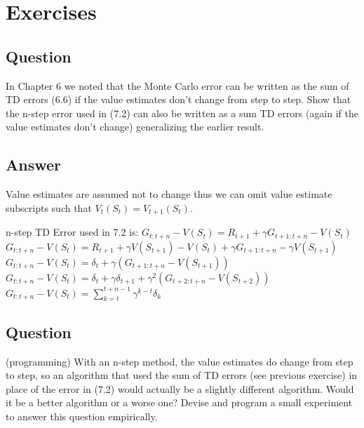 \documentclass[11pt]{article}
\begin{document}
    \maketitle
    \setcounter{section}{6}


    \section{Exercises}

    \subsection{Question}

    In Chapter 6 we noted that the Monte Carlo error can be written as the sum of TD errors (6.6) if the value estimates don’t change from step to step.
    Show that the n-step error used in (7.2) can also be written as a sum TD errors (again if the value estimates don’t change) generalizing the earlier result.

    \subsection*{Answer}

    Value estimates are assumed not to change thus we can omit value estimate subscripts such that $ V_t(S_t) = V_{t+1}(S_t)$.

    n-step TD Error used in 7.2  is:
    \newline
    $G_{t:t+n} - V(S_t) = R_{t+1} + \gamma G_{t+1:t+n} - V(S_t) $
    \newline
    $G_{t:t+n} - V(S_t) = R_{t+1} + \gamma V(S_{t+1}) - V(S_t) + \gamma G_{t+1:t+n} - \gamma V(S_{t+1}) $
    \newline
    $G_{t:t+n} - V(S_t) = \delta_t + \gamma ( G_{t+1:t+n} - V(S_{t+1}) ) $
    \newline
    $G_{t:t+n} - V(S_t) = \delta_t + \gamma \delta_{t+1} + \gamma^2 ( G_{t+2:t+n} - V(S_{t+2}) ) $
    \newline
    $G_{t:t+n} - V(S_t) = \sum_{k=t}^{t+n-1} \gamma^{k-t} \delta_k  $

    \subsection{Question}

    (programming) With an n-step method, the value estimates do change from step to step, so an algorithm that used the sum of TD errors (see previous exercise) in place of the error in (7.2) would actually be a slightly different algorithm.
    Would it be a better algorithm or a worse one?
    Devise and program a small experiment to answer this question empirically.
\end{document}
